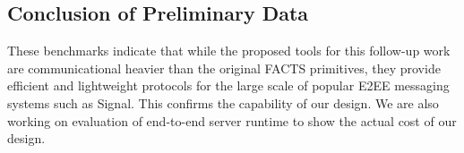 \subsection{Conclusion of Preliminary Data}
These benchmarks indicate that while the proposed tools for this follow-up work are communicational heavier than the original FACTS primitives, they provide efficient and lightweight protocols for the large scale of popular E2EE messaging systems such as Signal. This confirms the capability of our design. We are also working on evaluation of end-to-end server runtime to show the actual cost of our design. 